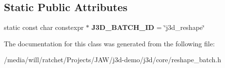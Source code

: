 \subsection*{Static Public Attributes}
\begin{DoxyCompactItemize}
\item 
\hypertarget{classj3d_1_1core_1_1ReshapeBatch_a025eb21b8151c9ae11e4a77c3717e117}{}static const char constexpr $\ast$ {\bfseries J3\+D\+\_\+\+B\+A\+T\+C\+H\+\_\+\+I\+D} = \char`\"{}j3d\+\_\+reshape\char`\"{}\label{classj3d_1_1core_1_1ReshapeBatch_a025eb21b8151c9ae11e4a77c3717e117}

\end{DoxyCompactItemize}


The documentation for this class was generated from the following file\+:\begin{DoxyCompactItemize}
\item 
/media/will/ratchet/\+Projects/\+J\+A\+W/j3d-\/demo/j3d/core/reshape\+\_\+batch.\+h\end{DoxyCompactItemize}
